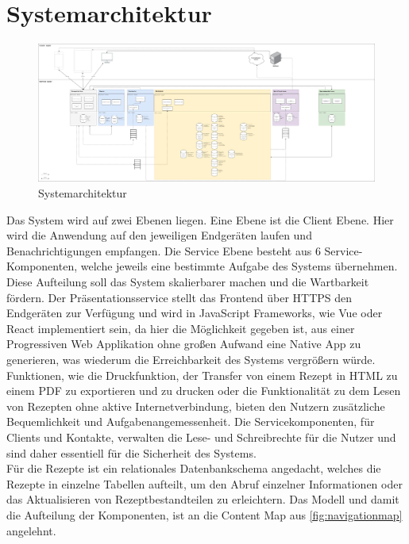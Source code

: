 \section{Systemarchitektur}
\begin{figure}[h] %
    \includegraphics[width=1\textwidth]{images/systemarchitechure.png}
    \caption[Systemarchitektur]{Systemarchitektur}
    \label{fig:systemarchitechure}
\end{figure}
Das System wird auf zwei Ebenen liegen. Eine Ebene ist die Client Ebene. Hier wird die Anwendung auf den jeweiligen Endgeräten laufen und Benachrichtigungen empfangen. Die Service Ebene besteht aus 6 Service-Komponenten, welche jeweils eine bestimmte Aufgabe des Systems übernehmen. Diese Aufteilung soll das System skalierbarer machen und die Wartbarkeit fördern. Der Präsentationsservice stellt das Frontend über HTTPS den Endgeräten zur Verfügung und wird in JavaScript Frameworks, wie Vue oder React implementiert sein, da hier die Möglichkeit gegeben ist, aus einer Progressiven Web Applikation ohne großen Aufwand eine Native App zu generieren, was wiederum die Erreichbarkeit des Systems vergrößern würde.\\ 

Funktionen, wie die Druckfunktion, der Transfer von einem Rezept in HTML zu einem PDF zu exportieren und zu drucken oder die Funktionalität zu dem Lesen von Rezepten ohne aktive Internetverbindung, bieten den Nutzern zusätzliche Bequemlichkeit und Aufgabenangemessenheit. Die Servicekomponenten, für Clients und Kontakte, verwalten die Lese- und Schreibrechte für die Nutzer und sind daher essentiell für die Sicherheit des Systems.\\ 

Für die Rezepte ist ein relationales Datenbankschema angedacht, welches die Rezepte in einzelne Tabellen aufteilt, um den Abruf einzelner Informationen oder das Aktualisieren von Rezeptbestandteilen zu erleichtern. Das Modell und damit die Aufteilung der Komponenten, ist an die Content Map aus \ref{fig:navigationmap} angelehnt.\\ 

